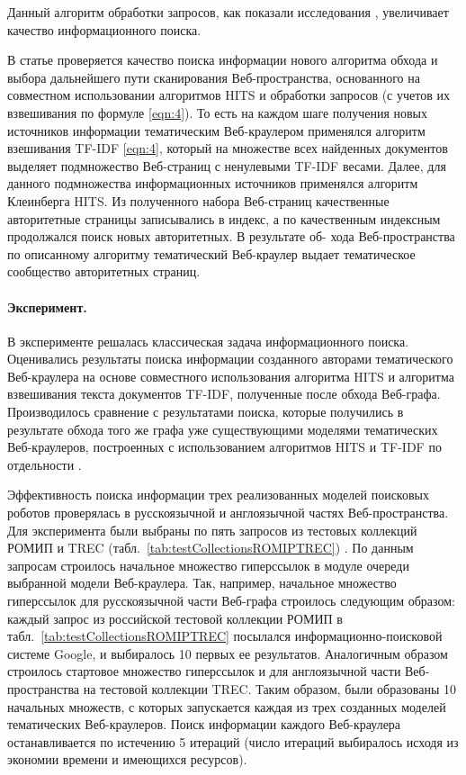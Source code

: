 Данный алгоритм обработки запросов, как показали исследования \cite{Gubin}, увеличивает качество информационного поиска.

В статье проверяется качество поиска информации нового алгоритма обхода и выбора дальнейшего пути сканирования Веб-пространства, основанного на совместном использовании алгоритмов HITS и обработки запросов (с учетов их взвешивания по формуле \cref{eqn:4}). То есть на каждом шаге получения новых источников информации тематическим Веб-краулером применялся алгоритм взешивания TF-IDF \cref{eqn:4}, который на множестве всех найденных документов выделяет подмножество Веб-страниц с ненулевыми TF-IDF весами. Далее, для данного подмножества информационных источников применялся алгоритм Клеинберга HITS. Из полученного набора Веб-страниц качественные авторитетные страницы записывались в индекс, а по качественным индексным продолжался поиск новых авторитетных. В результате об- хода Веб-пространства по описанному алгоритму тематический Веб-краулер выдает тематическое сообщество \cite{GibsonKleinbergRaghavan} авторитетных страниц.

\paragraph{Эксперимент.} В эксперименте решалась классическая задача информационного поиска. Оценивались результаты поиска информации созданного авторами тематического Веб-краулера на основе совместного использования алгоритма HITS и алгоритма взвешивания текста документов TF-IDF, полученные после обхода Веб-графа. Производилось сравнение с результатами поиска, которые получились в результате обхода того же графа уже существующими моделями тематических Веб-краулеров, построенных с использованием алгоритмов HITS и TF-IDF по отдельности \cite{BlekanovBondarenko2,Nekrestyanov}.

Эффективность поиска информации трех реализованных моделей поисковых роботов проверялась в русскоязычной и англоязычной частях Веб-пространства. Для эксперимента были выбраны по пять запросов из тестовых коллекций РОМИП и TREC (табл.~\cref{tab:testCollectionsROMIPTREC}) \cite{ROMIP,TREC}. По данным запросам строилось начальное множество гиперссылок в модуле очереди выбранной модели Веб-краулера. Так, например, начальное множество гиперссылок для русскоязычной части Веб-графа строилось следующим образом: каждый запрос из российской тестовой коллекции РОМИП в табл.~\cref{tab:testCollectionsROMIPTREC} посылался информационно-поисковой системе Google, и выбиралось 10 первых ее результатов. Аналогичным образом строилось стартовое множество гиперссылок и для англоязычной части Веб-пространства на тестовой коллекции TREC. Таким образом, были образованы 10 начальных множеств, с которых запускается каждая из трех созданных моделей тематических Веб-краулеров. Поиск информации каждого Веб-краулера останавливается по истечению 5 итераций (число итераций выбиралось исходя из экономии времени и имеющихся ресурсов).

